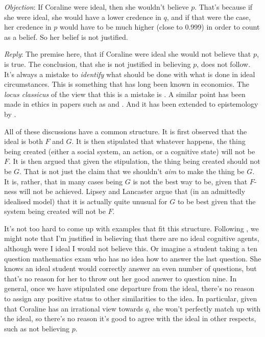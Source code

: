 \documentclass[11pt,oneside]{book}
\newcommand{\objrep}[2]{
\bigskip
\noindent \textit{Objection}: #1

\medskip
\noindent \textit{Reply}: #2

}
\begin{document}
\objrep{If Coraline were ideal, then she wouldn't believe $p$. That's because if she were ideal, she would have a lower credence in $q$, and if that were the case, her credence in $p$ would have to be much higher (close to 0.999) in order to count as a belief. So her belief is not justified.}
{The premise here, that if Coraline were ideal she would not believe that $p$, is true. The conclusion, that she is not justified in believing $p$, does not follow. It's always a mistake to \textit{identify} what should be done with what is done in ideal circumstances. This is something that has long been known in economics. The \textit{locus classicus} of the view that this is a mistake is \cite{LipseyLancaster}. A similar point has been made in ethics in papers such as \cite{Watson1977} and \cite{KennettSmith1996b, KennettSmith1996a}. And it has been extended to epistemology by \cite{Williamson1998-WILCOK}.

All of these discussions have a common structure. It is first observed that the ideal is both $F$ and $G$. It is then stipulated that whatever happens, the thing being created (either a social system, an action, or a cognitive state) will not be $F$. It is then argued that given the stipulation, the thing being created should not be $G$. That is not just the claim that we shouldn't \textit{aim} to make the thing be $G$. It is, rather, that in many cases being $G$ is not the best way to be, given that $F$-ness will not be achieved. Lipsey and Lancaster argue that (in an admittedly idealised model) that it is actually quite unusual for $G$ to be best given that the system being created will not be $F$.

It's not too hard to come up with examples that fit this structure. Following \cite[209]{Williamson2000-WILKAI}, we might note that I'm justified in believing that there are no ideal cognitive agents, although were I ideal I would not believe this. Or imagine a student taking a ten question mathematics exam who has no idea how to answer the last question. She knows an ideal student would correctly answer an even number of questions, but that's no reason for her to throw out her good answer to question nine. In general, once we have stipulated one departure from the ideal, there's no reason to assign any positive status to other similarities to the idea. In particular, given that Coraline has an irrational view towards $q$, she won't perfectly match up with the ideal, so there's no reason it's good to agree with the ideal in other respects, such as not believing $p$.

}
\end{document}
